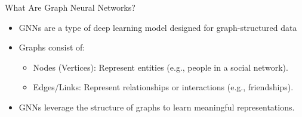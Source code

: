 \documentclass{beamer}
\begin{document}
\begin{frame}{What Are Graph Neural Networks?}
    \begin{itemize}
        \item GNNs are a type of deep learning model designed for graph-structured data
        \item Graphs consist of:
                \begin{itemize}
                \item Nodes (Vertices): Represent entities (e.g., people in a social network).
                \item Edges/Links: Represent relationships or interactions (e.g., friendships).
                
                \vspace{0.3cm}
                \centering %
                \end{itemize}
        \item GNNs leverage the structure of graphs to learn meaningful representations.   
    \end{itemize}
    
\end{frame}
\end{document}
